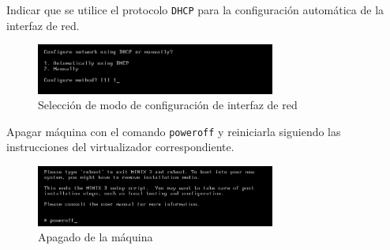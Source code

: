 \documentclass[12pt]{article}
\begin{document}
Indicar que se utilice el protocolo \texttt{DHCP} para la configuración automática de la interfaz de red.
\begin{figure}[H]
  \centering
  \includegraphics[width=0.7\textwidth]{vm/min30.png}
  \caption{Selección de modo de configuración de interfaz de red}
\end{figure}

Apagar máquina con el comando \texttt{poweroff} y reiniciarla siguiendo las instrucciones del virtualizador correspondiente.
\begin{figure}[H]
  \centering
  \includegraphics[width=0.7\textwidth]{vm/min31.png}
  \caption{Apagado de la máquina}
\end{figure}
\end{document}
